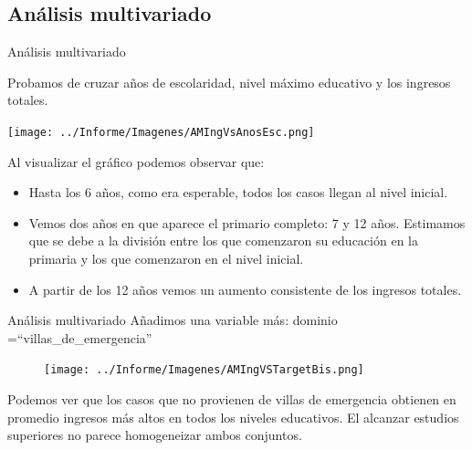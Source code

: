 \documentclass[pdf]{beamer}
\def\vspace{}%
\begin{document}

    \subsection{Análisis multivariado}

\begin{frame}{Análisis multivariado}
    \footnotesize

    Probamos de cruzar años de escolaridad, nivel máximo educativo y los ingresos totales.

    \begin{minipage}{0.6\textwidth}
        \texttt{[image: ../Informe/Imagenes/AMIngVsAnosEsc.png]}
    \end{minipage}
\begin{minipage}{0.39\textwidth}
    Al visualizar el gráfico podemos observar que:

    \begin{itemize}
    \justifying
        \item Hasta los 6 años, como era esperable, todos los casos llegan al nivel inicial.
        \item Vemos dos años en que aparece el primario completo: 7 y 12 años. Estimamos que se debe a la división entre los que comenzaron su educación en la primaria y los que comenzaron en el nivel inicial.
        \item A partir de los 12 años vemos un aumento consistente de los ingresos totales.
    \end{itemize}
\end{minipage}
\end{frame} 

\begin{frame}{Análisis multivariado}
Añadimos una variable más: dominio =``villas\_de\_emergencia''
    \begin{figure} 
        \texttt{[image: ../Informe/Imagenes/AMIngVSTargetBis.png]}
    \end{figure}
Podemos ver que los casos que no provienen de villas de emergencia  obtienen en promedio ingresos más altos en todos los niveles educativos. El alcanzar estudios superiores no parece homogeneizar ambos conjuntos. 

\end{frame}
\end{document}
